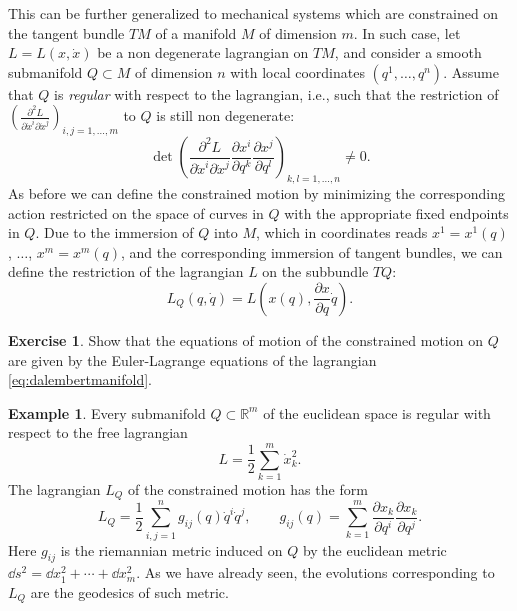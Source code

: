 \documentclass[english,fontsize=11pt,paper=b5]{scrbook}
\theoremstyle{definition}
\newtheorem{example}{Example}[chapter]
\newtheorem{exercise}{Exercise}[chapter]
\begin{document}
    This can be further generalized to mechanical systems which are constrained on the tangent bundle $TM$ of a manifold $M$ of dimension $m$.
    In such case, let  $L=L(x,\dot x)$ be a non degenerate lagrangian on $TM$, and consider a smooth submanifold $Q\subset M$ of dimension $n$ with local coordinates $(q^1,\ldots,q^n)$.
    Assume that $Q$ is \emph{regular} with respect to the lagrangian, i.e., such that the restriction of $\left(\frac{\partial^2 L}{\partial \dot x^i \partial\dot x^j}\right)_{i,j=1,\ldots,m}$ to $Q$ is still non degenerate:
    \begin{equation}
      \det\left(\frac{\partial^2 L}{\partial \dot x^i \partial\dot x^j}\frac{\partial x^i}{\partial q^k}\frac{\partial x^j}{\partial q^l}\right)_{k,l=1,\ldots,n} \neq 0.
    \end{equation}
    As before we can define the constrained motion by minimizing the corresponding action restricted on the space of curves in $Q$ with the appropriate fixed endpoints in $Q$. Due to the immersion of $Q$ into $M$, which in coordinates reads $x^1 = x^1(q)$, $\ldots$, $x^m=x^m(q)$, and the corresponding immersion of tangent bundles, we can define the restriction of the lagrangian $L$ on the subbundle $TQ$:
    \begin{equation}\label{eq:dalembertmanifold}
      L_Q(q,\dot q) = L\left(x(q), \frac{\partial x}{\partial q}\dot q\right).
    \end{equation}

    \begin{exercise}
      Show that the equations of motion of the constrained motion on $Q$ are given by the Euler-Lagrange equations of the lagrangian \eqref{eq:dalembertmanifold}.
    \end{exercise}

    \begin{example}
      Every submanifold $Q\subset \mathbb{R}^m$ of the euclidean space is regular with respect to the free lagrangian
      \begin{equation}
        L = \frac12 \sum_{k=1}^m \dot x^2_k.
      \end{equation}
      The lagrangian $L_Q$ of the constrained motion has the form
      \begin{equation}
        L_Q = \frac12 \sum_{i,j=1}^n g_{ij}(q)\dot q^i\dot q^j, \qquad g_{ij}(q) = \sum_{k=1}^m \frac{\partial x_k}{\partial q^i}\frac{\partial x_k}{\partial q^j}.
      \end{equation}
      Here $g_{ij}$ is the riemannian metric induced on $Q$ by the euclidean metric $\dd s^2 = \dd x_1^2 + \cdots + \dd x_m^2$.
      As we have already seen, the evolutions corresponding to $L_Q$ are the geodesics of such metric.
    \end{example}
\end{document}
